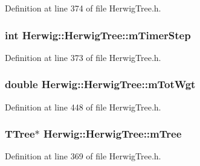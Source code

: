 Definition at line 374 of file Herwig\+Tree.\+h.

\subsubsection[{\texorpdfstring{m\+Timer\+Step}{mTimerStep}}]{\setlength{\rightskip}{0pt plus 5cm}int Herwig\+::\+Herwig\+Tree\+::m\+Timer\+Step\hspace{0.3cm}{\ttfamily [protected]}}\hypertarget{class_herwig_1_1_herwig_tree_a52f0f5dff398cec2740c10dd095f50ec}{}\label{class_herwig_1_1_herwig_tree_a52f0f5dff398cec2740c10dd095f50ec}


Definition at line 373 of file Herwig\+Tree.\+h.

\subsubsection[{\texorpdfstring{m\+Tot\+Wgt}{mTotWgt}}]{\setlength{\rightskip}{0pt plus 5cm}double Herwig\+::\+Herwig\+Tree\+::m\+Tot\+Wgt\hspace{0.3cm}{\ttfamily [protected]}}\hypertarget{class_herwig_1_1_herwig_tree_a60ae5fcc1fff4256bdd35074035e6a32}{}\label{class_herwig_1_1_herwig_tree_a60ae5fcc1fff4256bdd35074035e6a32}


Definition at line 448 of file Herwig\+Tree.\+h.

\subsubsection[{\texorpdfstring{m\+Tree}{mTree}}]{\setlength{\rightskip}{0pt plus 5cm}T\+Tree$\ast$ Herwig\+::\+Herwig\+Tree\+::m\+Tree\hspace{0.3cm}{\ttfamily [protected]}}\hypertarget{class_herwig_1_1_herwig_tree_a03788321f05cfb5f7a119beafbaa29d4}{}\label{class_herwig_1_1_herwig_tree_a03788321f05cfb5f7a119beafbaa29d4}


Definition at line 369 of file Herwig\+Tree.\+h.

